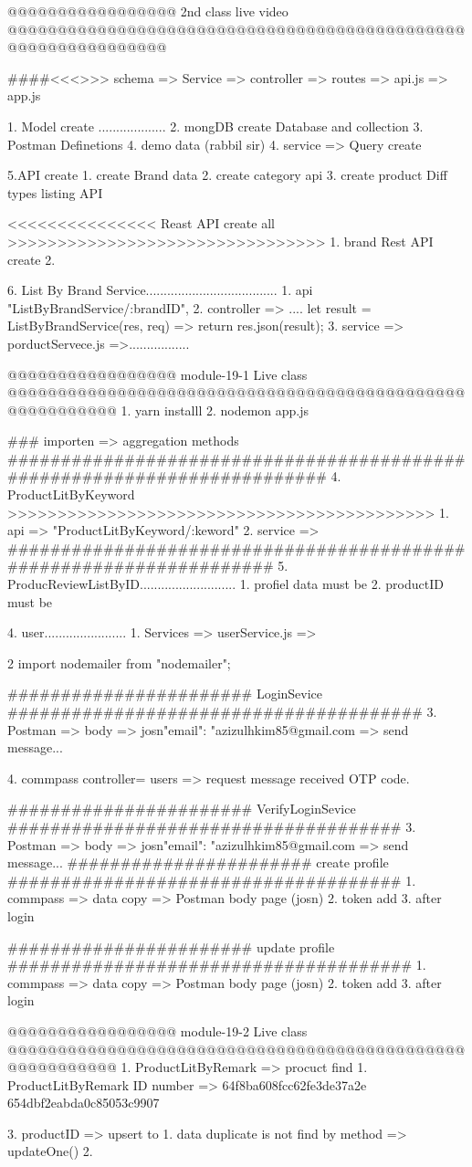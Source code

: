 @@@@@@@@@@@@@@@@@ 2nd class live video @@@@@@@@@@@@@@@@@@@@@@@@@@@@@@@@@@@@@@@@@@@@@@@@@@@@@@@@@@@@@@

####<<<>>> schema => Service => controller => routes => api.js => app.js

1. Model create ...................
2. mongDB create Database and collection 
3. Postman Definetions
4. demo data (rabbil sir)
4. service => Query create 

5.API create 
   1. create Brand data 
   2. create category api 
   3. create product Diff types listing API



<<<<<<<<<<<<<<< Reast API create all >>>>>>>>>>>>>>>>>>>>>>>>>>>>>>>>
1. brand Rest API create 
2.

6. List By Brand Service.....................................
   1. api "ListByBrandService/:brandID", 
   2. controller => ....
       let result = ListByBrandService(res, req) => {
        return res.json(result);
       }
   3. service => porductServece.js =>.................
      


@@@@@@@@@@@@@@@@@ module-19-1 Live class @@@@@@@@@@@@@@@@@@@@@@@@@@@@@@@@@@@@@@@@@@@@@@@@@@@@@@@@@
1. yarn installl 
2. nodemon app.js

### importen => aggregation methods 
#########################################################################
4. ProductLitByKeyword >>>>>>>>>>>>>>>>>>>>>>>>>>>>>>>>>>>>>>>>>>>
   1. api => "ProductLitByKeyword/:keword"
   2. service => 
####################################################################
5. ProducReviewListByID...........................
   1. profiel data must be 
   2. productID must be 

4. user.......................
   1. Services => userService.js => 

   2 import nodemailer from "nodemailer";

   

####################### LoginSevice #######################################
   3. Postman => body => josn{"email": "azizulhkim85@gmail.com} 
      => send message...

   4. commpass controller= users => request message received OTP code.

####################### VerifyLoginSevice #####################################
3. Postman => body => josn{"email": "azizulhkim85@gmail.com} 
           => send message...
####################### create profile #####################################
1. commpass => data copy => Postman body page (josn)
2. token add 
3. after login 

####################### update profile ######################################
1. commpass => data copy => Postman body page (josn)
2. token add 
3. after login 

@@@@@@@@@@@@@@@@@ module-19-2 Live class @@@@@@@@@@@@@@@@@@@@@@@@@@@@@@@@@@@@@@@@@@@@@@@@@@@@@@@@@
1. ProductLitByRemark  => procuct find 
1. ProductLitByRemark ID number => 64f8ba608fcc62fe3de37a2e      654dbf2eabda0c85053c9907

3. productID => upsert to 
  1. data duplicate is not find by method  => updateOne()
  2. 